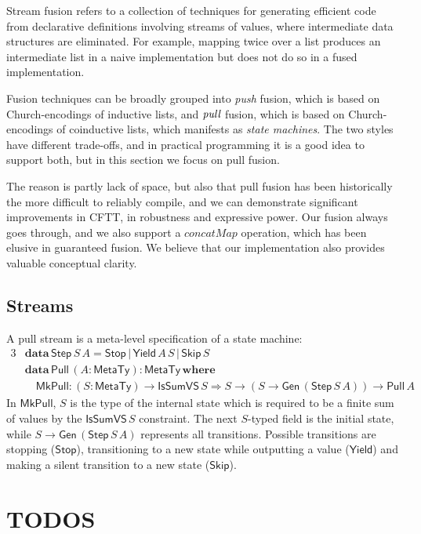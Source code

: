 \documentclass[acmsmall,screen,review,anonymous]{acmart}
\newcommand{\mit}[1]{\mathit{#1}}
\newcommand{\msf}[1]{\mathsf{#1}}
\newcommand{\mbf}[1]{\mathbf{#1}}
\newcommand{\ind}{\hspace{1em}}
\newcommand{\data}{\mbf{data}\,}
\newcommand{\where}{\mbf{where}}
\newcommand{\MTy}{\msf{MetaTy}}
\theoremstyle{remark}
\newcommand{\Gen}{\msf{Gen}}
\newcommand{\RA}{\Rightarrow}
\newcommand{\Stop}{\msf{Stop}}
\newcommand{\Skip}{\msf{Skip}}
\newcommand{\Yield}{\msf{Yield}}
\newcommand{\IsSumVS}{\msf{IsSumVS}}
\newcommand{\Step}{\msf{Step}}
\newcommand{\Pull}{\msf{Pull}}
\newcommand{\MkPull}{\msf{MkPull}}
\begin{document}
Stream fusion refers to a collection of techniques for generating efficient code
from declarative definitions involving streams of values, where intermediate
data structures are eliminated. For example, mapping twice over a list produces
an intermediate list in a naive implementation but does not do so in a fused
implementation.

Fusion techniques can be broadly grouped into \emph{push} fusion, which is based
on Church-encodings of inductive lists, and $\emph{pull}$ fusion, which is based
on Church-encodings of coinductive lists, which manifests as \emph{state
machines}. The two styles have different trade-offs, and in practical
programming it is a good idea to support both, but in this section we focus on
pull fusion.

The reason is partly lack of space, but also that pull fusion has been
historically the more difficult to reliably compile, and we can demonstrate
significant improvements in CFTT, in robustness and expressive power. Our fusion
always goes through, and we also support a $\mit{concatMap}$ operation, which
has been elusive in guaranteed fusion. We believe that our implementation also
provides valuable conceptual clarity.

\subsection{Streams}

A pull stream is a meta-level specification of a state machine:
\begin{alignat*}{3}
  & \data \Step\,S\,A = \Stop\,|\,\Yield\,A\,S\,|\,\Skip\,S\\
  & \data \Pull\,(A : \MTy) : \MTy\,\where\\
  & \ind \MkPull : (S : \MTy) \to \IsSumVS\,S \RA S \to (S \to \Gen\,(\Step\,S\,A)) \to \Pull\,A
\end{alignat*}
In $\MkPull$, $S$ is the type of the internal state which is required to be a
finite sum of values by the $\IsSumVS\,S$ constraint. The next $S$-typed field
is the initial state, while $S \to \Gen\,(\Step\,S\,A)$ represents all
transitions. Possible transitions are stopping ($\Stop$), transitioning to a
new state while outputting a value ($\Yield$) and making a silent transition to
a new state ($\Skip$).


\section{TODOS}
\end{document}
